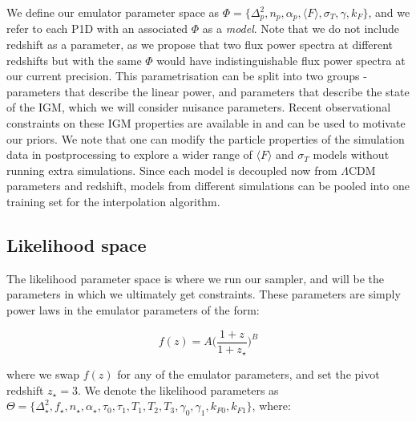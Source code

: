 \documentclass[]{article}
\begin{document}
\noindent We define our emulator parameter space as $\Phi=\{ \Delta^2_p,n_p,\alpha_p,\langle F\rangle,\sigma_T,\gamma,k_F \}$, and we refer to each P1D with an associated 
$\Phi$ as a \textit{model}. Note that we do not include redshift as a parameter, as we 
propose that two flux power spectra at different redshifts but with the same $\Phi$ would 
have indistinguishable flux power spectra at our current precision. This parametrisation 
can be split into two groups - parameters that describe the linear power, and parameters 
that describe the state of the IGM, which we will consider nuisance parameters. Recent 
observational constraints on these IGM properties are available in \cite{Walther2018} and 
can be used to motivate our priors. We note that one can modify the particle properties 
of the simulation data in postprocessing to explore a wider range of $\langle F\rangle$ 
and $\sigma_T$ models without running extra simulations. Since each model is decoupled 
now from $\Lambda$CDM parameters and redshift, models from different simulations can be 
pooled into one training set for the interpolation algorithm.

\subsection{Likelihood space}
The likelihood parameter space is where we run our sampler, and will be the parameters in 
which we ultimately get constraints. These parameters are simply power laws in the 
emulator parameters of the form:

\begin{equation}
    f(z)=A\bigg(\frac{1+z}{1+z_\star}\bigg)^B
\end{equation}

\noindent where we swap $f(z)$ for any of the emulator parameters, and set the pivot 
redshift $z_\star=3$. We denote the likelihood parameters as $\Theta=\{ \Delta^2_\star, f_\star, n_\star, \alpha_\star, \tau_0, \tau_1, T_1, T_2, T_3, \gamma_0, \gamma_1, k_{F0}, k_{F1} \}$, where:
\end{document}
